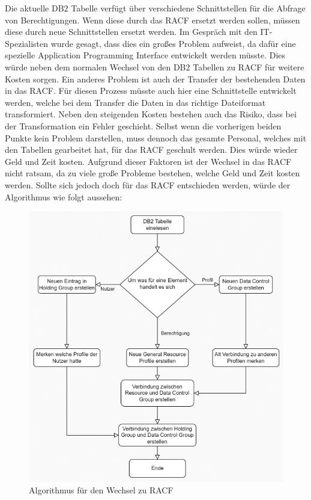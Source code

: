 Die aktuelle DB$2$ Tabelle verfügt über verschiedene Schnittstellen für die Abfrage von Berechtigungen.
Wenn diese durch das \ac{RACF} ersetzt werden sollen, müssen diese durch neue Schnittstellen ersetzt werden.
Im Gespräch mit den IT-Spezialisten wurde gesagt, dass dies ein großes Problem aufweist, da dafür eine spezielle Application Programming Interface entwickelt werden müsste.
Dies würde neben dem normalen Wechsel von den DB$2$ Tabellen zu \ac{RACF} für weitere Kosten sorgen.
\newline
Ein anderes Problem ist auch der Transfer der bestehenden Daten in das \ac{RACF}.
Für diesen Prozess müsste auch hier eine Schnittstelle entwickelt werden, welche bei dem Transfer die Daten in das richtige Dateiformat transformiert.
Neben den steigenden Kosten bestehen auch das Risiko, dass bei der Transformation ein Fehler geschieht.
\newline
Selbst wenn die vorherigen beiden Punkte kein Problem darstellen, muss dennoch das gesamte Personal, welches mit den Tabellen gearbeitet hat, für das \ac{RACF} geschult werden.
Dies würde wieder Geld und Zeit kosten.
Aufgrund dieser Faktoren ist der Wechsel in das \ac{RACF} nicht ratsam, da zu viele große Probleme bestehen, welche Geld und Zeit kosten werden.
\newline
Sollte sich jedoch doch für das \ac{RACF} entschieden werden, würde der Algorithmus wie folgt aussehen:
\begin{figure}[h!]
 \centering
 \includegraphics[width=1\textwidth]{gfx/Picture/racf.PNG}
 \caption{Algorithmus für den Wechsel zu RACF}
 \label{fig:racf}
\end{figure}